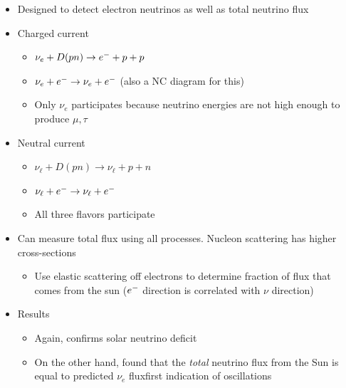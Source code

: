 \begin{itemize}
\begin{itemize}
    \item Designed to detect electron neutrinos as well as total neutrino flux
    \item Charged current
    \begin{itemize}
      \item $\nu_e +D(pn) \rightarrow e^{-}+p+p$
      \item $\nu_e+e^{-} \rightarrow \nu_e+e^{-}$ (also a NC diagram for this)
      \item Only $\nu_e$ participates because neutrino energies are not high enough to produce $\mu,\tau$
    \end{itemize}
    \item Neutral current
    \begin{itemize}
      \item $\nu_\ell+D(pn)\rightarrow \nu_\ell+p+n$
      \item $\nu_\ell + e^{-} \rightarrow \nu_\ell+e^{-}$
      \item All three flavors participate
    \end{itemize}
    \item Can measure total flux using all processes. Nucleon scattering has higher cross-sections
    \begin{itemize}
      \item Use elastic scattering off electrons to determine fraction of flux that comes from the sun ($e^{-}$ direction is correlated with $\nu$ direction)
    \end{itemize}
    \item Results
    \begin{itemize}
      \item Again, confirms solar neutrino deficit
      \item On the other hand, found that the \emph{total} neutrino flux from the Sun is equal to predicted $\nu_e$ flux\thus first indication of oscillations
    \end{itemize}
  \end{itemize}
\end{itemize}

